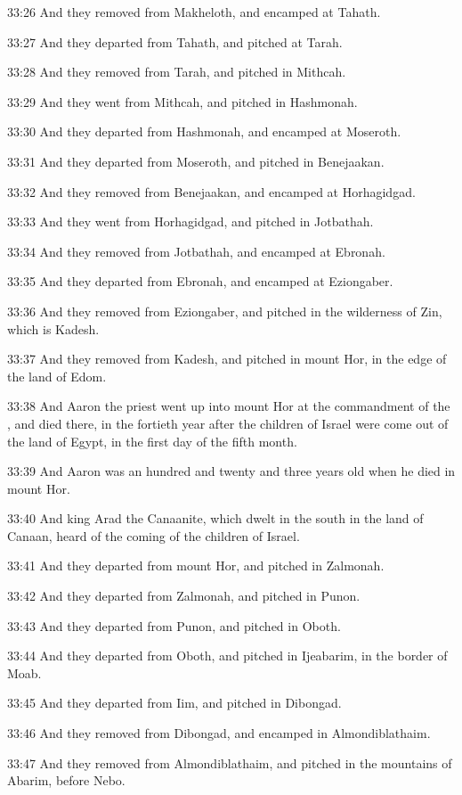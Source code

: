 33:26 And they removed from Makheloth, and encamped at Tahath.

33:27 And they departed from Tahath, and pitched at Tarah.

33:28 And they removed from Tarah, and pitched in Mithcah.

33:29 And they went from Mithcah, and pitched in Hashmonah.

33:30 And they departed from Hashmonah, and encamped at Moseroth.

33:31 And they departed from Moseroth, and pitched in Benejaakan.

33:32 And they removed from Benejaakan, and encamped at Horhagidgad.

33:33 And they went from Horhagidgad, and pitched in Jotbathah.

33:34 And they removed from Jotbathah, and encamped at Ebronah.

33:35 And they departed from Ebronah, and encamped at Eziongaber.

33:36 And they removed from Eziongaber, and pitched in the wilderness of Zin, which is Kadesh.

33:37 And they removed from Kadesh, and pitched in mount Hor, in the edge of the land of Edom.

33:38 And Aaron the priest went up into mount Hor at the commandment of the \LORD, and died there, in the fortieth year after the children of Israel were come out of the land of Egypt, in the first day of the fifth month.

33:39 And Aaron was an hundred and twenty and three years old when he died in mount Hor.

33:40 And king Arad the Canaanite, which dwelt in the south in the land of Canaan, heard of the coming of the children of Israel.

33:41 And they departed from mount Hor, and pitched in Zalmonah.

33:42 And they departed from Zalmonah, and pitched in Punon.

33:43 And they departed from Punon, and pitched in Oboth.

33:44 And they departed from Oboth, and pitched in Ijeabarim, in the border of Moab.

33:45 And they departed from Iim, and pitched in Dibongad.

33:46 And they removed from Dibongad, and encamped in Almondiblathaim.

33:47 And they removed from Almondiblathaim, and pitched in the mountains of Abarim, before Nebo.

